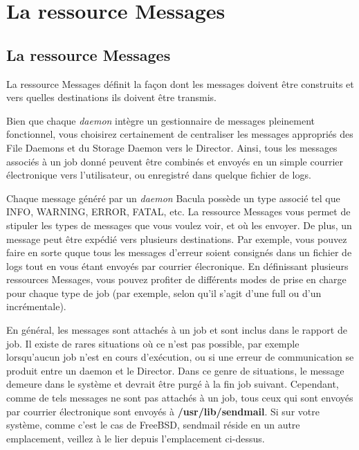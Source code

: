 
\chapter{La ressource Messages}
\label{_ChapterStart15}

\section{La ressource  Messages}
\label{MessageResource}

La ressource Messages d\'efinit la fa\c{c}on dont les messages doivent \^etre construits 
et vers quelles destinations ils doivent \^etre transmis.

Bien que chaque {\it daemon} int\`egre un gestionnaire de messages pleinement 
fonctionnel, vous choisirez certainement de centraliser les messages appropri\'es 
des File Daemons et du Storage Daemon vers le Director. Ainsi, tous les messages 
associ\'es \`a un job donn\'e peuvent \^etre combin\'es et envoy\'es en un simple courrier 
\'electronique vers l'utilisateur, ou enregistr\'e dans quelque fichier de logs.

Chaque message g\'en\'er\'e par un {\it daemon} Bacula poss\`ede un type associ\'e tel 
que INFO, WARNING, ERROR, FATAL, etc. La ressource Messages vous permet de 
stipuler les types de messages que vous voulez voir, et o\`u les envoyer. De plus, 
un message peut \^etre exp\'edi\'e vers plusieurs destinations. Par exemple, vous 
pouvez faire en sorte quque tous les messages d'erreur soient consign\'es dans un 
fichier de logs tout en vous \'etant envoy\'es par courrier \'elecronique. En 
d\'efinissant plusieurs ressources Messages, vous pouvez profiter de diff\'erents 
modes de prise en charge pour chaque type de job (par exemple, selon qu'il 
s'agit d'une full ou d'un incr\'ementale). 

En g\'en\'eral, les messages sont attach\'es \`a un job et sont inclus dans le rapport de job. 
Il existe de rares situations o\`u ce n'est pas possible, par exemple lorsqu'aucun 
job n'est en cours d'ex\'ecution, ou si une erreur de communication se produit 
entre un daemon et le Director. Dans ce genre de situations, le message demeure 
dans le syst\`eme et devrait \^etre purg\'e \`a la fin job suivant. Cependant, comme de tels 
messages ne sont pas attach\'es \`a un job, tous ceux qui sont envoy\'es par courrier 
\'electronique sont envoy\'es \`a {\bf /usr/lib/sendmail}. Si sur votre syst\`eme, comme c'est 
le cas de FreeBSD, sendmail r\'eside en un autre emplacement, veillez \`a le lier 
depuis l'emplacement ci-dessus. 

